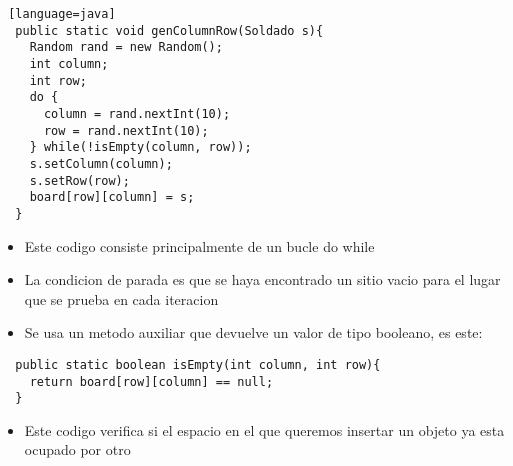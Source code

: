 \begin{lstlisting} [language=java]
  public static void genColumnRow(Soldado s){
    Random rand = new Random();
    int column;
    int row;
    do {
      column = rand.nextInt(10);
      row = rand.nextInt(10);
    } while(!isEmpty(column, row));
    s.setColumn(column);
    s.setRow(row);
    board[row][column] = s;
  }
\end{lstlisting}
\begin{itemize}
  \item Este codigo consiste principalmente de un bucle do while 
  \item La condicion de parada es que se haya encontrado un sitio vacio para el lugar que se prueba en cada iteracion
  \item Se usa un metodo auxiliar que devuelve un valor de tipo booleano, es este:
\end{itemize}
\begin{lstlisting}
  public static boolean isEmpty(int column, int row){
    return board[row][column] == null;
  }
\end{lstlisting}
\begin{itemize}
  \item Este codigo verifica si el espacio en el que queremos insertar un objeto ya esta ocupado por otro
\end{itemize}
